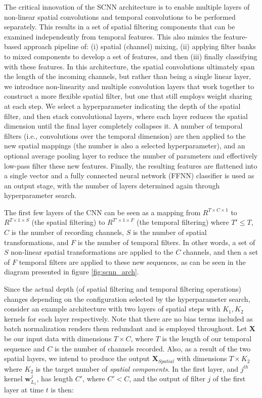 \documentclass[fleqn,10pt]{wlscirep}
\begin{document}
The critical innovation of the SCNN architecture is to enable multiple layers of non-linear spatial convolutions and temporal convolutions to be performed separately. This results in a set of spatial filtering components that can be examined independently from temporal features. This also mimics the feature-based approach pipeline of: (i) spatial (channel) mixing, (ii) applying filter banks to mixed components to develop a set of features, and then (iii) finally classifying with these features. In this architecture, the spatial convolutions ultimately span the length of the incoming channels, but rather than being a single linear layer, we introduce non-linearity and multiple convolution layers that work together to construct a more flexible spatial filter, but one that still employs weight sharing at each step. We select a hyperparameter indicating the depth of the spatial filter, and then stack convolutional layers, where each layer reduces the spatial dimension until the final layer completely collapses it. A number of temporal filters (i.e., convolutions over the temporal dimension) are then applied to the new spatial mappings (the number is also a selected hyperparameter), and an optional average pooling layer to reduce the number of parameters and effectively low-pass filter these new features. Finally, the resulting features are flattened into a single vector and a fully connected neural network (FFNN) classifier is used as an output stage, with the number of layers determined again through hyperparameter search.

The first few layers of the CNN can be seen as a mapping from $R^{T \times C \times 1}$ to $R^{T \times 1 \times S}$ (the spatial filtering) to $R^{T' \times 1 \times F }$ (the temporal filtering) where $T' \leq T$, $C$ is the number of recording channels, $S$ is the number of spatial transformations, and $F$ is the number of temporal filters. In other words, a set of $S$ non-linear spatial transformations are applied to the $C$ channels, and then a set of $F$ temporal filters are applied to these new sequences, as can be seen in the diagram presented in figure \ref{fig:scnn_arch}.

Since the actual depth (of spatial filtering and temporal filtering operations) changes depending on the configuration selected by the hyperparameter search, consider an example architecture with two layers of spatial steps with $K_1, K_2$ kernels for each layer respectively. Note that there are no bias terms included as batch normalization \cite{Szegedy2015} renders them redundant and is employed throughout. Let $\boldsymbol{X}$ be our input data with dimensions $T \times C$, where $T$ is the length of our temporal sequence and $C$ is the number of channels recorded. Also, as a result of the two spatial layers, we intend to produce the output $\boldsymbol{X}_{Spatial}$ with dimensions $T \times K_2$ where $K_2$ is the target number of {\em spatial components}. In the first layer, and $j^{th}$ kernel $\boldsymbol{w}_{L_1}^j$, has length $C'$, where $C' < C$, and the output of filter $j$ of the first layer at time $t$ is then:
\end{document}
